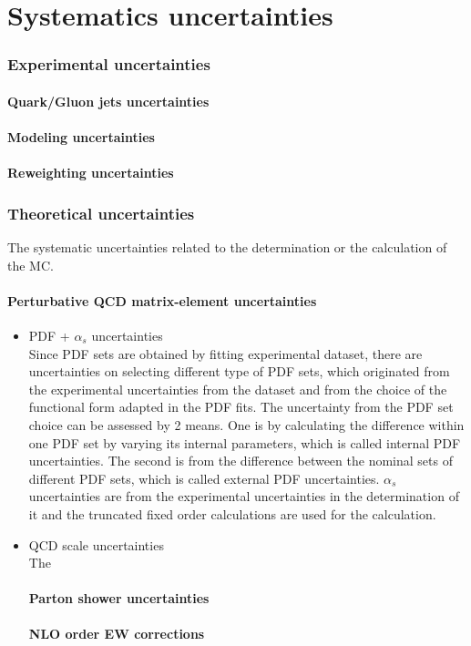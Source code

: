 \chapter{Systematics uncertainties}



\subsection{Experimental uncertainties}
\subsubsection{Quark/Gluon jets uncertainties}
\subsubsection{Modeling uncertainties}
\subsubsection{Reweighting uncertainties}
\subsection{Theoretical uncertainties}
The systematic uncertainties related to the determination or the calculation of the MC.
\subsubsection{Perturbative QCD matrix-element uncertainties}
\begin{itemize}
      \item PDF + $\alpha_s$ uncertainties\\
      Since PDF sets are obtained by fitting experimental dataset, there are uncertainties on selecting different type of PDF sets, which originated from the experimental uncertainties from the dataset and from the choice of the functional form adapted in the PDF fits.
      The uncertainty from the PDF set choice can be assessed by 2 means. One is by calculating the difference within one PDF set by varying its internal parameters, which is called internal PDF uncertainties. The second is from the difference between the nominal sets of different PDF sets, which is called external PDF uncertainties.
      $\alpha_s$ uncertainties are from the experimental uncertainties in the determination of it and the truncated fixed order calculations are used for the calculation.
      \item QCD scale uncertainties\\
      The 
\subsubsection{Parton shower uncertainties}
\subsubsection{NLO order EW corrections}
\end{itemize}
